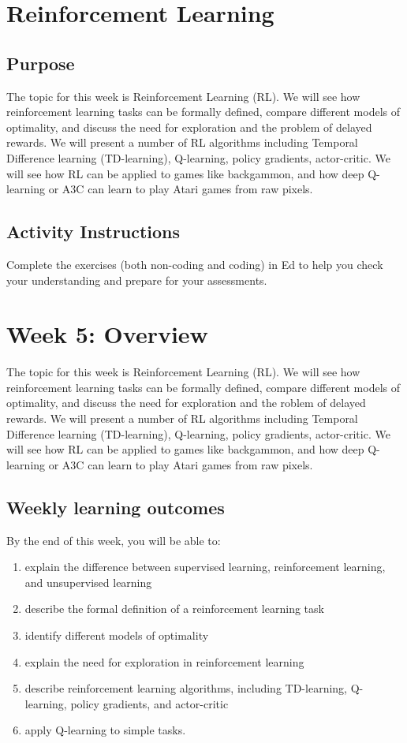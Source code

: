 \documentclass[11pt]{article}
\begin{document}
\section{Reinforcement Learning}\label{sec:reinforcement-learning}
\subsection{Purpose}\label{subsec:purpose}
The topic for this week is Reinforcement Learning (RL).
We will see how reinforcement learning tasks can be formally defined, compare
different models of optimality, and discuss the need for exploration and the
problem of delayed rewards.
We will present a number of RL algorithms including Temporal Difference
learning (TD-learning), Q-learning, policy gradients, actor-critic.
We will see how RL can be applied to games like backgammon, and how deep
Q-learning or A3C can learn to play Atari games from raw pixels.

\subsection{Activity Instructions}\label{subsec:activity-instructions}
Complete the exercises (both non-coding and coding) in Ed to help you check
your understanding and prepare for your assessments.

\section{Week 5: Overview}\label{sec:week-5:-overview}
The topic for this week is Reinforcement Learning (RL).
We will see how reinforcement learning tasks can be formally defined, compare
different models of optimality, and discuss the need for exploration and the
roblem of delayed rewards.
We will present a number of RL algorithms including Temporal Difference
learning (TD-learning), Q-learning, policy gradients, actor-critic.
We will see how RL can be applied to games like backgammon, and how deep
Q-learning or A3C can learn to play Atari games from raw pixels.

\subsection{Weekly learning outcomes}\label{subsec:weekly-learning-outcomes}
By the end of this week, you will be able to:

\begin{enumerate}
  \item explain the difference between supervised learning, reinforcement learning, and unsupervised learning
  \item describe the formal definition of a reinforcement learning task
  \item identify different models of optimality
  \item explain the need for exploration in reinforcement learning
  \item describe reinforcement learning algorithms, including TD-learning, Q-learning, policy gradients, and actor-critic
  \item apply Q-learning to simple tasks.
\end{enumerate}
\end{document}
